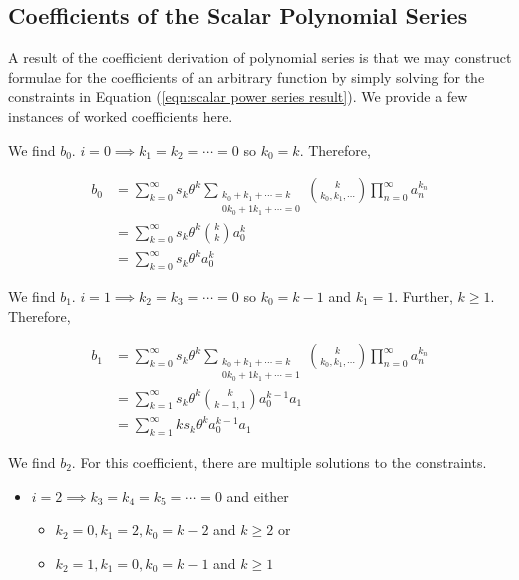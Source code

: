\subsection{Coefficients of the Scalar Polynomial Series}
\label{sec:worked scalar coeffs}

A result of the coefficient derivation of polynomial series is that we may construct formulae for the coefficients of an arbitrary function by simply solving for the constraints in Equation (\ref{eqn:scalar power series result}). We provide a few instances of worked coefficients here. 

We find $b_0$. $i = 0 \implies k_1 = k_2 = \cdots = 0$ so $k_0 = k$. Therefore,

\begin{align}
    b_0 
    &= \sum_{k=0}^{\infty} s_k \theta^k \sum_{\substack{k_0 + k_1 + \cdots = k \\ 0 k_0 + 1 k_1 + \cdots = 0}} \binom{k}{k_0, k_1, \cdots} \prod_{n=0}^{\infty} a_n^{k_n} \nonumber \\
    &= \sum_{k=0}^{\infty} s_k \theta^k \binom{k}{k} a_0^{k} \nonumber \\
    &= \sum_{k=0}^{\infty} s_k \theta^k a_0^k
\end{align}

We find $b_1$. $i = 1 \implies k_2 = k_3 = \cdots = 0$ so $k_0 = k - 1$ and $k_1 = 1$. Further, $k \geq 1$. Therefore,

\begin{align}
    b_1
    &= \sum_{k=0}^{\infty} s_k \theta^k \sum_{\substack{k_0 + k_1 + \cdots = k \\ 0 k_0 + 1 k_1 + \cdots = 1}} \binom{k}{k_0, k_1, \cdots} \prod_{n=0}^{\infty} a_n^{k_n} \nonumber \\
    &= \sum_{k=1}^{\infty} s_k \theta^k \binom{k}{k - 1, 1} a_0^{k - 1} a_1 \nonumber \\
    &= \sum_{k=1}^{\infty} k s_k \theta^k a_0^{k-1} a_1
\end{align}

We find $b_2$. For this coefficient, there are multiple solutions to the constraints. 

\begin{itemize}
    \item $i = 2 \implies k_3 = k_4 = k_5 = \cdots = 0$ and either
    \begin{itemize}
        \item $k_2 = 0, k_1 = 2, k_0 = k - 2$ and $k \geq 2$ or
        \item $k_2 = 1, k_1 = 0, k_0 = k - 1$ and $k \geq 1$
    \end{itemize}
\end{itemize}


